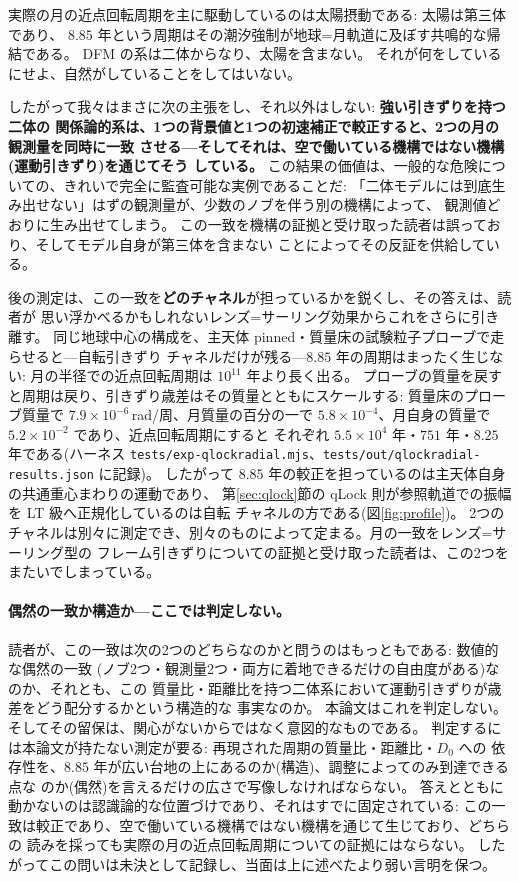 \documentclass[a4paper,10pt,twocolumn]{ltjsarticle}
\begin{document}
実際の月の近点回転周期を主に駆動しているのは太陽摂動である: 太陽は第三体であり、
$8.85$ 年という周期はその潮汐強制が地球=月軌道に及ぼす共鳴的な帰結である。
DFM の系は二体からなり、太陽を含まない。
それが何をしているにせよ、自然がしていることをしてはいない。

したがって我々はまさに次の主張をし、それ以外はしない: \textbf{強い引きずりを持つ二体の
関係論的系は、1つの背景値と1つの初速補正で較正すると、2つの月の観測量を同時に一致
させる---そしてそれは、空で働いている機構ではない機構(運動引きずり)を通じてそう
している。}
この結果の価値は、一般的な危険についての、きれいで完全に監査可能な実例であることだ:
「二体モデルには到底生み出せない」はずの観測量が、少数のノブを伴う別の機構によって、
観測値どおりに生み出せてしまう。
この一致を機構の証拠と受け取った読者は誤っており、そしてモデル自身が第三体を含まない
ことによってその反証を供給している。

後の測定は、この一致を\textbf{どのチャネル}が担っているかを鋭くし、その答えは、読者が
思い浮かべるかもしれないレンズ=サーリング効果からこれをさらに引き離す。
同じ地球中心の構成を、主天体 pinned・質量床の試験粒子プローブで走らせると---自転引きずり
チャネルだけが残る---$8.85$ 年の周期はまったく生じない: 月の半径での近点回転周期は
$10^{11}$ 年より長く出る。
プローブの質量を戻すと周期は戻り、引きずり歳差はその質量とともにスケールする:
質量床のプローブ質量で $7.9\times10^{-6}$\,rad/周、月質量の百分の一で
$5.8\times10^{-4}$、月自身の質量で $5.2\times10^{-2}$ であり、近点回転周期にすると
それぞれ $5.5\times10^{4}$ 年・$751$ 年・$8.25$ 年である(ハーネス
\texttt{tests/exp-qlockradial.mjs}、\texttt{tests/out/qlockradial-results.json} に記録)。
したがって $8.85$ 年の較正を担っているのは主天体自身の共通重心まわりの運動であり、
第\ref{sec:qlock}節の qLock 則が参照軌道での振幅を LT 級へ正規化しているのは自転
チャネルの方である(図\ref{fig:profile})。
2つのチャネルは別々に測定でき、別々のものによって定まる。月の一致をレンズ=サーリング型の
フレーム引きずりについての証拠と受け取った読者は、この2つをまたいでしまっている。

\paragraph*{偶然の一致か構造か---ここでは判定しない。}
読者が、この一致は次の2つのどちらなのかと問うのはもっともである: 数値的な偶然の一致
(ノブ2つ・観測量2つ・両方に着地できるだけの自由度がある)なのか、それとも、この
質量比・距離比を持つ二体系において運動引きずりが歳差をどう配分するかという構造的な
事実なのか。
本論文はこれを判定しない。そしてその留保は、関心がないからではなく意図的なものである。
判定するには本論文が持たない測定が要る: 再現された周期の質量比・距離比・$D_0$ への
依存性を、$8.85$ 年が広い台地の上にあるのか(構造)、調整によってのみ到達できる点な
のか(偶然)を言えるだけの広さで写像しなければならない。
答えとともに動かないのは認識論的な位置づけであり、それはすでに固定されている:
この一致は較正であり、空で働いている機構ではない機構を通じて生じており、どちらの
読みを採っても実際の月の近点回転周期についての証拠にはならない。
したがってこの問いは未決として記録し、当面は上に述べたより弱い言明を保つ。
\end{document}
